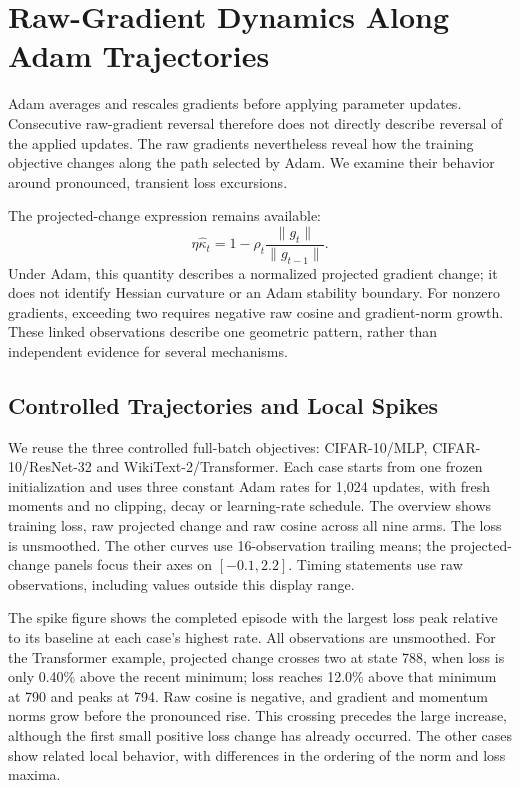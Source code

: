 \section{Raw-Gradient Dynamics Along Adam Trajectories}

Adam averages and rescales gradients before applying parameter updates.
Consecutive raw-gradient reversal therefore does not directly describe reversal
of the applied updates. The raw gradients nevertheless reveal how the training
objective changes along the path selected by Adam. We examine their behavior
around pronounced, transient loss excursions.

The projected-change expression remains available:
\begin{equation}
 \eta\widehat\kappa_t
 =1-\rho_t\frac{\|g_t\|}{\|g_{t-1}\|}.
\end{equation}
Under Adam, this quantity describes a normalized projected gradient change;
it does not identify Hessian curvature or an Adam stability boundary. For
nonzero gradients, exceeding two requires negative raw cosine and gradient-norm
growth. These linked observations describe one geometric pattern, rather than
independent evidence for several mechanisms.

\subsection{Controlled Trajectories and Local Spikes}

We reuse the three controlled full-batch objectives: CIFAR-10/MLP,
CIFAR-10/ResNet-32 and WikiText-2/Transformer. Each case starts from one frozen
initialization and uses three constant Adam rates for 1,024 updates, with fresh
moments and no clipping, decay or learning-rate schedule. The overview shows
training loss, raw projected change and raw cosine across all nine arms.
The loss is unsmoothed. The other curves use 16-observation trailing means;
the projected-change panels focus their axes on
$[-0.1,2.2]$. Timing statements use raw observations, including values outside
this display range.

The spike figure shows the completed episode with the largest loss peak relative
to its baseline at each case's highest rate. All observations are unsmoothed.
For the Transformer example, projected change crosses two at state 788, when
loss is only 0.40\% above the recent minimum; loss reaches 12.0\% above that
minimum at 790 and peaks at 794. Raw cosine is negative, and gradient and
momentum norms grow before the pronounced rise. This crossing precedes the
large increase, although the first small positive loss change has already
occurred. The other cases show related local behavior, with differences in
the ordering of the norm and loss maxima.

